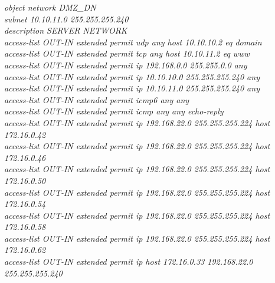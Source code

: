 \documentclass[12pt,a4paper]{report}
\begin{document}
\hspace*{1cm}\textit{object network DMZ\_DN\\
\hspace*{1cm}subnet 10.10.11.0 255.255.255.240\\
\hspace*{1cm}description SERVER NETWORK\\
\hspace*{1cm}access-list OUT-IN extended permit udp any host 10.10.10.2 eq domain \\
\hspace*{1cm}access-list OUT-IN extended permit tcp any host 10.10.11.2 eq www \\
\hspace*{1cm}access-list OUT-IN extended permit ip 192.168.0.0 255.255.0.0 any \\
\hspace*{1cm}access-list OUT-IN extended permit ip 10.10.10.0 255.255.255.240 any \\
\hspace*{1cm}access-list OUT-IN extended permit ip 10.10.11.0 255.255.255.240 any \\
\hspace*{1cm}access-list OUT-IN extended permit icmp6 any any\\
\hspace*{1cm}access-list OUT-IN extended permit icmp any any echo-reply\\
\hspace*{1cm}access-list OUT-IN extended permit ip 192.168.22.0 255.255.255.224 host 172.16.0.42\\
\hspace*{1cm}access-list OUT-IN extended permit ip 192.168.22.0 255.255.255.224 host 172.16.0.46\\
\hspace*{1cm}access-list OUT-IN extended permit ip 192.168.22.0 255.255.255.224 host 172.16.0.50\\
\hspace*{1cm}access-list OUT-IN extended permit ip 192.168.22.0 255.255.255.224 host 172.16.0.54\\
\hspace*{1cm}access-list OUT-IN extended permit ip 192.168.22.0 255.255.255.224 host 172.16.0.58\\
\hspace*{1cm}access-list OUT-IN extended permit ip 192.168.22.0 255.255.255.224 host 172.16.0.62\\
\hspace*{1cm}access-list OUT-IN extended permit ip host 172.16.0.33 192.168.22.0 255.255.255.240\\
}
\end{document}
